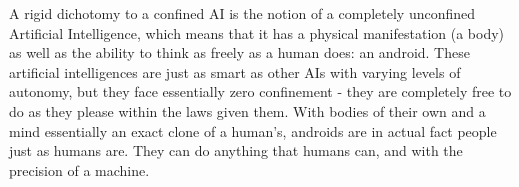 A rigid dichotomy to a confined AI is the notion of a completely unconfined Artificial Intelligence, which means that it has a physical manifestation (a body) as well as the ability to think as freely as a human does: an android. These artificial intelligences are just as smart as other AIs with varying levels of autonomy, but they face essentially zero confinement - they are completely free to do as they please within the laws given them. With bodies of their own and a mind essentially an exact clone of a human's, androids are in actual fact people just as humans are. They can do anything that humans can, and with the precision of a machine.
